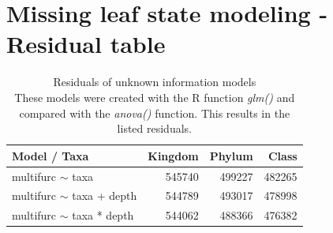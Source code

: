   \section{Missing leaf state modeling - Residual table}\label{sec:Residuals unknown information}
    \begin{table}[h!]
      \begin{center}
        \begin{tabular}{ |l|r|r|r| }
          \hline
          \bfseries Model / Taxa & \bfseries Kingdom & \bfseries Phylum & \bfseries Class \\
          \hline \hline
          multifurc $\sim$ taxa & 545740 & \cellcolor{green!10}499227 & \cellcolor{green!30}482265 \\
          \hline
          multifurc $\sim$ taxa + depth & 544789 & \cellcolor{green!10}493017 & \cellcolor{green!50}478998 \\
          \hline
          multifurc $\sim$ taxa * depth & 544062 & \cellcolor{green!30}488366 & \cellcolor{green!50}476382 \\
          \hline
        \end{tabular}
      \end{center}
      \caption{Residuals of unknown information models \\
        These models were created with the R function \textit{glm()} and compared with the 
          \textit{anova()} function. This results in the listed residuals.}
    \end{table}

